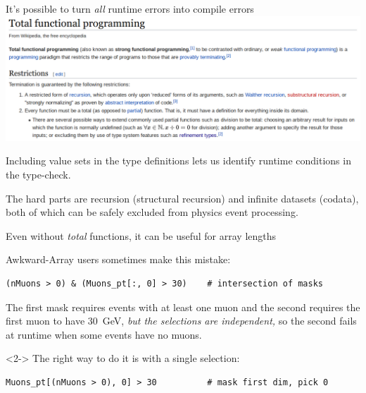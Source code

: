 \documentclass[aspectratio=169]{beamer}
\begin{document}
\begin{frame}{It's possible to turn {\it all} runtime errors into compile errors}
\large
\vspace{0.4 cm}
\includegraphics[width=0.98\linewidth]{totalfunctional-wikipedia.png}

\vspace{0.25 cm}
Including value sets in the type definitions lets us identify runtime conditions in the type-check.

\vspace{0.25 cm}
The hard parts are recursion (structural recursion) and infinite datasets (codata), both of which can be safely excluded from physics event processing.
\end{frame}

\begin{frame}[fragile]{Even without {\it total} functions, it can be useful for array lengths}
\large
\vspace{0.5 cm}

Awkward-Array users sometimes make this mistake:

\small\begin{verbatim}
(nMuons > 0) & (Muons_pt[:, 0] > 30)    # intersection of masks
\end{verbatim}
\large

\vspace{0.25 cm}
The first mask requires events with at least one muon and the second requires the first muon to have 30~GeV, {\it but the selections are independent,} so the second fails at runtime when some events have no muons.

\vspace{0.5 cm}
\begin{uncoverenv}<2->
The right way to do it is with a single selection:

\small\begin{verbatim}
Muons_pt[(nMuons > 0), 0] > 30          # mask first dim, pick 0
\end{verbatim}
\end{uncoverenv}

\large

\vspace{0.25 cm}
\end{frame}
\end{document}
